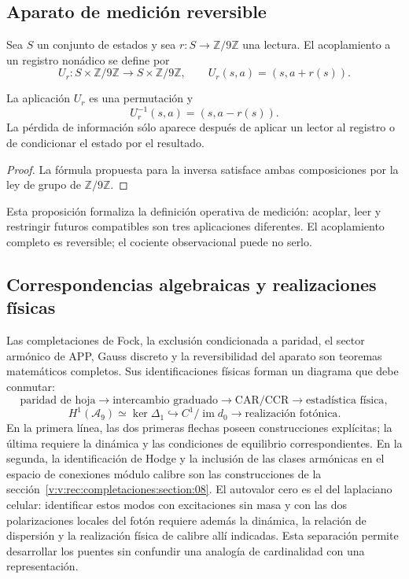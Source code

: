 \subsection{Aparato de medición reversible}
\label{v:v:rec:completaciones:section:10}

Sea \(S\) un conjunto de estados y sea \(r:S\to\mathbb Z/9\mathbb Z\) una
lectura. El acoplamiento a un registro nonádico se define por
\[
 U_r:S\times\mathbb Z/9\mathbb Z\longrightarrow
 S\times\mathbb Z/9\mathbb Z,
 \qquad
 U_r(s,a)=(s,a+r(s)).
\]

\begin{proposition}
\label{v:v:rec:completaciones:statement:05}
La aplicación \(U_r\) es una permutación y
\[
 U_r^{-1}(s,a)=(s,a-r(s)).
\]
La pérdida de información sólo aparece después de aplicar un lector al
registro o de condicionar el estado por el resultado.
\end{proposition}

\begin{proof}
La fórmula propuesta para la inversa satisface ambas composiciones por la
ley de grupo de \(\mathbb Z/9\mathbb Z\).
\end{proof}

Esta proposición formaliza la definición operativa de medición: acoplar,
leer y restringir futuros compatibles son tres aplicaciones diferentes. El
acoplamiento completo es reversible; el cociente observacional puede no serlo.

\subsection{Correspondencias algebraicas y realizaciones físicas}
\label{v:v:rec:completaciones:section:11}

Las completaciones de Fock, la exclusión condicionada a paridad, el sector
armónico de APP, Gauss discreto y la reversibilidad del aparato son teoremas
matemáticos completos. Sus identificaciones físicas forman un diagrama que
debe conmutar:
\[
 \text{paridad de hoja}
 \longrightarrow\text{intercambio graduado}
 \longrightarrow\text{CAR/CCR}
 \longrightarrow\text{estadística física},
\]
\[
 H^1(\mathcal A_9)\simeq\ker\Delta_1
 \hookrightarrow C^1/\operatorname{im}d_0
 \longrightarrow\text{realización fotónica}.
\]
En la primera línea, las dos primeras flechas poseen construcciones
explícitas; la última requiere la dinámica y las condiciones de equilibrio
correspondientes. En la segunda, la identificación de Hodge y la inclusión
de las clases armónicas en el espacio de conexiones módulo calibre son las
construcciones de la sección~\ref{v:v:rec:completaciones:section:08}. El autovalor
cero es el del laplaciano celular: identificar estos modos con excitaciones
sin masa y con las dos polarizaciones locales del fotón requiere además la
dinámica, la relación de dispersión y la realización física de calibre allí
indicadas. Esta separación permite desarrollar los puentes sin confundir una
analogía de cardinalidad con una representación.
